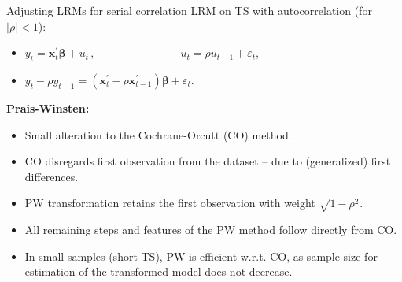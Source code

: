 \documentclass{beamer}
\begin{document}
\begin{frame}{Adjusting LRMs for serial correlation}
LRM on TS with autocorrelation (for $|\rho|<1$):\\ \medskip
\begin{itemize}
    \item $y_t=\bm{x}_t^{\prime} \bm{\beta} + u_t \,,\qquad \qquad \qquad~~~~~~~\, u_t = \rho u_{t-1}+\varepsilon_t$,
    \item $y_t - \rho y_{t-1} =  ( \bm{x}_t^{\prime} - \rho \bm{x}_{t-1}^{\prime}) \bm{\beta} + \varepsilon_t$.
\end{itemize}
\medskip
\textbf{Prais-Winsten:} \\ \medskip
\begin{itemize}
    \item Small alteration to the Cochrane-Orcutt (CO) method.
    \item CO disregards first observation from the dataset -- due to (generalized) first differences.
    \medskip
    \item PW transformation retains the first observation with weight $\sqrt{1-\rho^2}$.
    \item All remaining steps and features of the PW method follow directly from CO. 
    \item In small samples (short TS), PW is efficient w.r.t. CO, as sample size for estimation of the transformed model does not decrease.
\end{itemize}
\end{frame}
\end{document}
